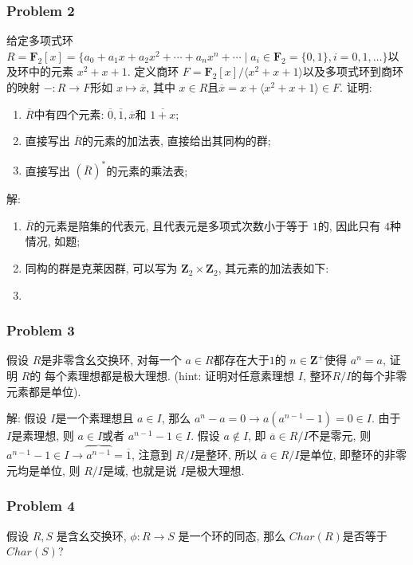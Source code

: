 \documentclass[a4paper,12pt]{ctexart}
\newcommand{\Z}{\mathbf{Z}}
\newcommand{\F}{\mathbf{F}}
\begin{document}
\subsubsection*{Problem 2}
   给定多项式环 $ R=\F_2[x]=\{a_0+a_1x+a_2x^2+\cdots+a_nx^n+\cdots\mid a_i\in\F_2=\{0,1\},i=0,1,\dots\} $以及环中的元素 $ x^2+x+1 $. 
   定义商环 $ F=\F_2[x]/\langle x^2+x+1\rangle $以及多项式环到商环的映射 $ -:R\rightarrow F $形如
   $ x\mapsto \overline{x} $, 其中 $ x\in R $且$ \overline{x}=x+\langle x^2+x+1\rangle\in F $.
   证明:
   \begin{enumerate}
     \item $ \overline{R} $中有四个元素: $ \overline{0},\overline{1},\overline{x} $和 $ \overline{1+x} $;
     \item 直接写出 $ \overline{R} $的元素的加法表, 直接给出其同构的群;
     \item 直接写出 $ (\overline{R})^* $的元素的乘法表;
   \end{enumerate}

   解:
   \begin{enumerate}
     \item $ \overline{R} $的元素是陪集的代表元, 且代表元是多项式次数小于等于 $ 1 $的, 因此只有 $ 4 $种情况, 如题;
     \item 同构的群是克莱因群, 可以写为  $ \Z_2\times\Z_2 $, 其元素的加法表如下:
     \item 
   \end{enumerate}
   
   \vspace{60 pt}
\subsubsection*{Problem 3}
    假设 $ R $是非零含幺交换环, 对每一个 $ a\in R $都存在大于$1$的 $ n\in\Z^+ $使得 $ a^n=a $, 证明 $ R $的
    每个素理想都是极大理想. (hint: 证明对任意素理想 $ I $, 整环$ R/I $的每个非零元素都是单位). 

    解: 假设 $ I $是一个素理想且 $ a\in I $, 那么 $ a^n-a=0\rightarrow a(a^{n-1}-1)=0\in I $. 由于 $ I $是素理想, 则 $ a\in I $或者 $ a^{n-1}-1\in I $.
    假设 $ a\notin I $, 即 $ \overline{a}\in R/I $不是零元, 则 $ a^{n-1}-1\in I\rightarrow\overbrace{a^{n-1}}=\overline{1} $, 注意到 $ R/I $是整环, 所以
    $ \overline{a}\in R/I $是单位, 即整环的非零元均是单位, 则 $ R/I $是域, 也就是说 $ I $是极大理想.
\subsubsection*{Problem 4}
    假设 $ R,S $ 是含幺交换环, $ \phi:R\rightarrow S $ 是一个环的同态, 那么 $ Char(R) $是否等于 $ Char(S) $? 
\end{document}
